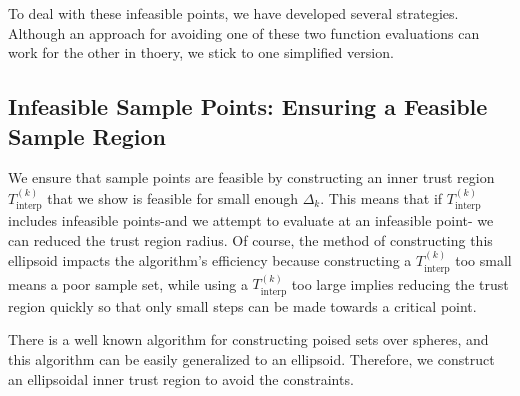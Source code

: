 \documentclass{article}
\theoremstyle{case}
\numberwithin{theorem}{subsection}
\newcommand{\dk}{\Delta_k}
\newcommand{\sampletrk}{{T_{\text{interp}}^{(k)}}}
\begin{document}
To deal with these infeasible points, we have developed several strategies.
Although an approach for avoiding one of these two function evaluations can work for the other in thoery, we stick to one simplified version.

% 
% 
% 
% 
% 
% 


\subsection{Infeasible Sample Points: Ensuring a Feasible Sample Region}
\label{possible_ellipsoids}

We ensure that sample points are feasible by constructing an inner trust region $\sampletrk$ that we show is feasible for small enough $\dk$.
This means that if $\sampletrk$ includes infeasible points-and we attempt to evaluate at an infeasible point- we can reduced the trust region radius.
Of course, the method of constructing this ellipsoid impacts the algorithm's efficiency because constructing a $\sampletrk$ too small means a poor sample set,
while using a $\sampletrk$ too large implies reducing the trust region quickly so that only small steps can be made towards a critical point.

There is a well known algorithm for constructing poised sets over spheres, and this algorithm can be easily generalized to an ellipsoid.
Therefore, we construct an ellipsoidal inner trust region to avoid the constraints.
\end{document}
